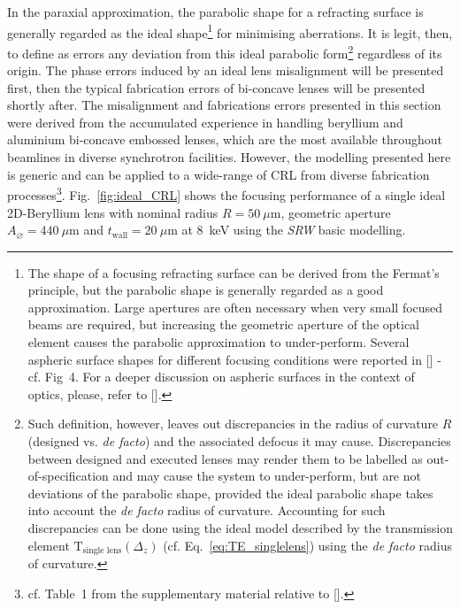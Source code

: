 \begin{refsection}
In the paraxial approximation, the parabolic shape for a refracting surface is generally regarded as the ideal shape\footnote{The shape of a focusing refracting surface can be derived from the Fermat's principle, but the parabolic shape is generally regarded as a good approximation. Large apertures are often necessary when very small focused beams are required, but increasing the geometric aperture of the optical element causes the parabolic approximation to under-perform. Several aspheric surface shapes for different focusing conditions were reported in [\cite{SanchezdelRio2012}] - cf. Fig~4. For a deeper discussion on aspheric surfaces in the context of optics, please, refer to [\cite{Schulz1988}].} for minimising aberrations. It is legit, then, to define as errors any deviation from this ideal parabolic form\footnote{Such definition, however, leaves out discrepancies in the radius of curvature $R$ (designed vs. \textit{de facto}) and the associated defocus it may cause. Discrepancies between designed and executed lenses may render them to be labelled as out-of-specification and may cause the system to under-perform, but are not deviations of the parabolic shape, provided the ideal parabolic shape takes into account the \textit{de facto} radius of curvature. Accounting for such discrepancies can be done using the ideal model described by the transmission element $\mathrm{T}_{\text{single lens}}(\Delta_z)$ (cf. Eq.~\ref{eq:TE_singlelens}) using the \textit{de facto} radius of curvature.} regardless of its origin. The phase errors induced by an ideal lens misalignment will be presented first, then the typical fabrication errors of bi-concave lenses will be presented shortly after. The misalignment and fabrications errors presented in this section were derived from the accumulated experience in handling beryllium and aluminium bi-concave embossed lenses, which are the most available throughout beamlines in diverse synchrotron facilities. However, the modelling presented here is generic and can be applied to a wide-range of CRL from diverse fabrication processes\footnote{cf. Table~1 from the supplementary material relative to [\cite{Roth2017}].}. Fig.~\ref{fig:ideal_CRL} shows the focusing performance of a single ideal 2D-Beryllium lens with nominal radius $R=50~\mu\text{m}$, geometric aperture $A_{\diameter}=440~\mu\text{m}$ and $t_\text{wall}=20~\mu$m at 8~keV using the \textit{SRW} basic modelling. 


\end{refsection}
